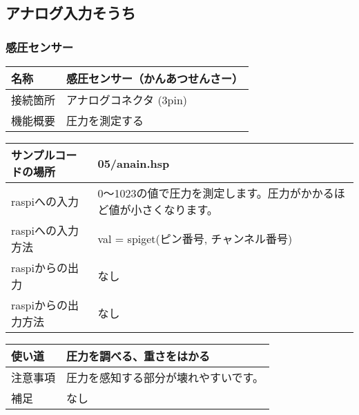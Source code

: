\subsection{アナログ入力そうち}\label{analog_in}
\subsubsection{感圧センサー}\label{touch}
\begin{table}[H]
  {\renewcommand\arraystretch{1.4}
    \begin{tabular}{|p{\colF}|p{\colG}|}	\hline
    名称 & 感圧センサー（かんあつせんさー）\\ \hline
    接続箇所 & アナログコネクタ (3pin)\\ \hline
    機能概要 & 圧力を測定する\\ \hline
    \end{tabular}
  }
\end{table}

\begin{table}[H]
  {\renewcommand\arraystretch{1.4}
    \begin{tabular}{|p{\colF}|p{\colG}|}	\hline
    サンプルコードの場所 & 05/anain.hsp\\ \hline
    raspiへの入力 & 0～1023の値で圧力を測定します。圧力がかかるほど値が小さくなります。\\ \hline
    raspiへの入力方法 & val = spiget(ピン番号, チャンネル番号)\\ \hline
    raspiからの出力 & なし\\ \hline
    raspiからの出力方法 & なし\\ \hline
    \end{tabular}
  }
\end{table}

\begin{table}[H]
  {\renewcommand\arraystretch{1.4}
    \begin{tabular}{|p{\colF}|p{\colG}|} \hline
    使い道 & 圧力を調べる、重さをはかる\\ \hline
    注意事項 & 圧力を感知する部分が壊れやすいです。\\ \hline
    補足 & なし\\ \hline
    \end{tabular}
  }
\end{table}

